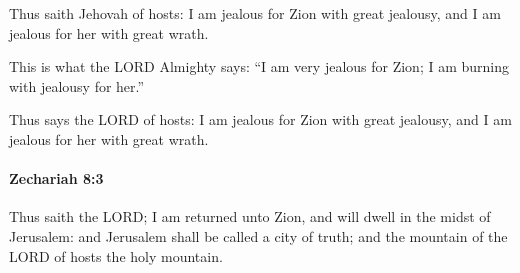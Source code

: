 			\begin{versebox}
					\item[BHS] 
					\item[LXX] 
					\item[ASV] Thus saith Jehovah of hosts: I am jealous for Zion with great jealousy, and I am jealous for her with great wrath.
					\item[NIV] This is what the LORD Almighty says: “I am very jealous for Zion; I am burning with jealousy for her.”
					\item[NRSV] Thus says the LORD of hosts: I am jealous for Zion with great jealousy, and I am jealous for her with great wrath.
			\end{versebox}

		\paragraph{Zechariah 8:3} %
			\label{ZECHARIAH-8-3}

			Thus saith the LORD; I am returned unto Zion, and will dwell in the midst of Jerusalem: and Jerusalem shall be called a city of truth; and the mountain of the LORD of hosts the holy mountain.

